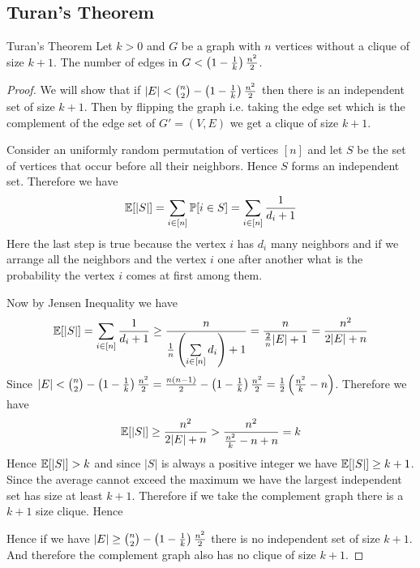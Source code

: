 \subsection{Turan's Theorem}
\begin{Theorem}{Turan's Theorem}{}
	Let $k>0$ and $G$ be a graph with $n$ vertices without a clique of size $k+1$. The number of edges in $G < \left(1-\frac1k\right)\frac{n^2}{2}$. 
\end{Theorem}
\begin{proof}
	We will show that if $|E|< \binom{n}2-\left(1-\frac1k\right)\frac{n^2}2$ then there is an independent set of size $k+1$. Then by flipping the graph i.e. taking the edge set which is  the complement of the edge set of $G'=(V,E)$ we get a clique of size $k+1$.
	
	Consider an uniformly random permutation of vertices $[n]$ and let $S$ be the set of vertices that occur before all their neighbors. Hence $S$ forms an independent set. Therefore we have $$\mathbb{E}[|S|]=\sum_{i\in[n]}\mathbb{P}[i\in S]=\sum_{i\in [n]}\frac1{d_i+1}$$Here the last step is true because the vertex $i$ has $d_i$ many neighbors and if we arrange all the neighbors and the vertex $i$ one after another what is the probability the vertex $i$ comes at first among them. 
	
	Now by Jensen Inequality we have $$\mathbb{E}[|S|]=\sum_{i\in[n]}\frac{1}{d_i+1}\geq \frac{n}{\frac1n\left(\sum\limits_{i\in[n]}d_i\right)+1}=\frac{n}{\frac2n|E|+1}=\frac{n^2}{2|E|+n}$$Since  $|E|< \binom{n}2-\left(1-\frac1k\right)\frac{n^2}2=\frac{n(n-1)}2-\left(1-\frac1k\right)\frac{n^2}2=\frac12\left(\frac{n^2}k-n\right)$. Therefore we have $$\mathbb{E}[|S|]\geq \frac{n^2}{2|E|+n}>\frac{n^2}{\frac{n^2}k-n+n}=k$$Hence $\mathbb{E}[|S|]>k$ and since $|S|$ is always a positive integer we have $\mathbb{E}[|S|]\geq k+1$. Since the average cannot exceed the maximum we have the largest independent set has size at least $k+1$. Therefore if we take the complement graph there is a $k+1$ size clique. Hence
	
	Hence if we have $|E|\geq \binom{n}2-\left(1-\frac1k\right)\frac{n^2}2$ there is no independent set of size $k+1$. And therefore the complement graph also has no clique of size $k+1$.
\end{proof}

